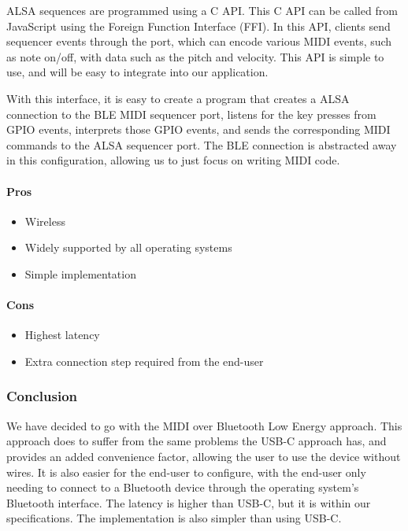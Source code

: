 ALSA sequences are programmed using a C API. This C API can be called from JavaScript
using the Foreign Function Interface (FFI). In this API, clients send sequencer events
through the port, which can encode various MIDI events, such as note on/off, with data
such as the pitch and velocity. This API is simple to use, and will be easy to integrate
into our application.

With this interface, it is easy to create a program that creates a ALSA connection to the
BLE MIDI sequencer port, listens for the key presses from GPIO events, interprets those
GPIO events, and sends the corresponding MIDI commands to the ALSA sequencer port. The BLE
connection is abstracted away in this configuration, allowing us to just focus on writing
MIDI code.

\paragraph{Pros}

\begin{itemize}
  \item Wireless
  \item Widely supported by all operating systems
  \item Simple implementation
\end{itemize}

\paragraph{Cons}

\begin{itemize}
  \item Highest latency
  \item Extra connection step required from the end-user
\end{itemize}

\subsubsection{Conclusion}

We have decided to go with the MIDI over Bluetooth Low Energy approach. This approach does
to suffer from the same problems the USB-C approach has, and provides an added convenience
factor, allowing the user to use the device without wires. It is also easier for the
end-user to configure, with the end-user only needing to connect to a Bluetooth device
through the operating system's Bluetooth interface. The latency is higher than USB-C, but
it is within our specifications. The implementation is also simpler than using USB-C.

